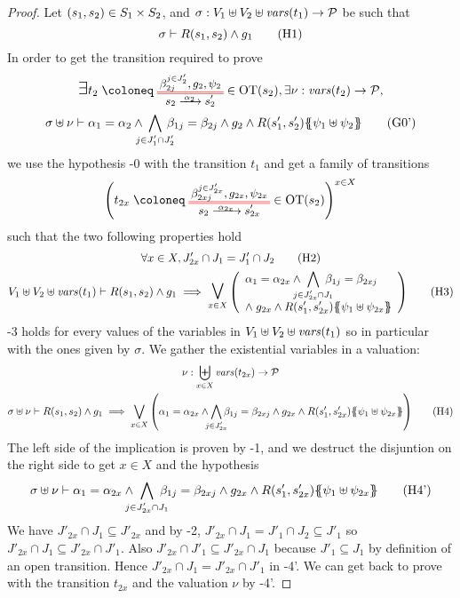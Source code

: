 \documentclass{article}
\begin{document}
\begin{proof} Let \({\left(s_1, s_2\right)} \in S_1 \times S_2\),  and \(\sigma: V_1 \uplus V_2 \uplus \mathit{vars}{\left(t_1\right)} \to \mathcal{P}\) be such that
\[ \sigma \vdash R\mpar{s_1, s_2} \wedge g_1 \hyp{1} \]
In order to get the transition required to prove
\begin{multline}
	\bigsymb{\exists} t_2 \defobject \OTx{2}{}{2}{2} \in \fOT{s_2}, \exists \nu: \fvars{t_2} \to \values, \\
	\sigma \uplus \nu \vdash \alpha_1 = \alpha_2 \wedge \bigwedge_\subbox{j \in J'_1 \cap J'_2} \beta_{1j} = \beta_{2j} \wedge g_2 \wedge R\mpar{s'_1, s'_2}\psubst{\psi_1 \uplus \psi_2} \goal{0'}
\end{multline}
we use the hypothesis \hyp{0} with the transition \(t_1\) and get a family of transitions
\[ \mpar{t_{2x} \defobject \OTx{2}{x}{2x}{2x} \in \fOT{s_2}}^{x \in X} \]
such that the two following properties hold
\begin{gather}
	\forall x \in X, J'_{2x} \cap J_1 = J'_1 \cap J_2 \hyp{2} \\
	V_1 \uplus V_2 \uplus \fvars{t_1} \vdash R\mpar{s_1, s_2} \wedge g_1 \implies \operatorname*{\bigsymb{\bigvee}}_{x \in X} \mpar{\everymath{\displaystyle}\begin{array}{l}
		\alpha_1 = \alpha_{2x} \wedge \bigwedge_\subbox{j \in J'_{2x} \cap J_1} \beta_{1j} = \beta_{2xj} \\[12pt]
		\nwedge g_{2x} \wedge R\mpar{s'_1, s'_{2x}}\psubst{\psi_1 \uplus \psi_{2x}}
	\end{array}} \hyp{3}
\end{gather}
\hyp{3} holds for every values of the variables in \(V_1 \uplus V_2 \uplus \mathit{vars}{\left(t_1\right)}\) so in particular with the ones given by \(\sigma\).
We gather the existential variables in a valuation:
\begin{gather*}
	\nu: \biguplus_{x \in X} \fvars{t_{2x}} \to \values \\
	\sigma \uplus \nu \vdash R\mpar{s_1, s_2} \wedge g_1 \implies \bigvee_{x \in X} \mpar{\alpha_1 = \alpha_{2x} \wedge \bigwedge_\subbox{j \in J'_{2x}} \beta_{1j} = \beta_{2xj} \wedge g_{2x} \wedge R\mpar{s'_1, s'_{2x}}\psubst{\psi_1 \uplus \psi_{2x}}} \hyp{4}
\end{gather*}
The left side of the implication is proven by \hyp{1}, and we destruct the disjuntion on the right side to get \(x \in X\) and the hypothesis
\[ \sigma \uplus \nu \vdash \alpha_1 = \alpha_{2x} \wedge \bigwedge_\subbox{j \in J'_{2x} \cap J_1} \beta_{1j} = \beta_{2xj} \wedge g_{2x} \wedge R\mpar{s'_1, s'_{2x}}\psubst{\psi_1 \uplus \psi_{2x}} \hyp{4'} \]
We have \(J'_{2x} \cap J_1 \subseteq J'_{2x}\) and by \hyp{2}, \(J'_{2x} \cap J_1 = J'_1 \cap J_2 \subseteq J'_1\) so \(J'_{2x} \cap J_1 \subseteq J'_{2x} \cap J'_1\).
Also \(J'_{2x} \cap J'_1 \subseteq J'_{2x} \cap J_1\) because \(J'_1 \subseteq J_1\) by definition of an open transition.
Hence \(J'_{2x} \cap J_1 = J'_{2x} \cap J'_1\) in \hyp{4'}.
We can get back to prove  with the transition \(t_{2x}\) and the valuation \(\nu\) by \hyp{4'}.
\end{proof}
\end{document}
